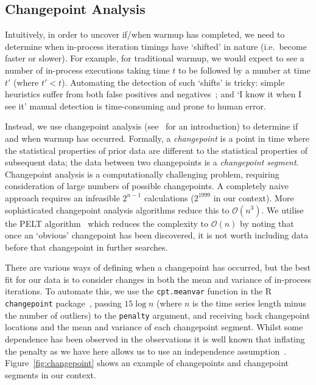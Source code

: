 \documentclass[acmsmall]{acmart}\settopmatter{printfolios=true}
\begin{document}
\subsection{Changepoint Analysis}

Intuitively, in order to uncover if/when warmup has completed, we need to
determine when in-process iteration timings have `shifted' in nature (i.e.~become
faster or slower). For example, for traditional warmup, we would expect to see a
number of in-process executions taking time $t$ to be followed by a number at
time $t'$ (where $t' < t$). Automating the detection of such `shifts' is
tricky: simple heuristics suffer from both false positives and negatives~\cite{kalibera13rigorous}; and
`I know it when I see it' manual detection is time-consuming and prone to human
error.

Instead, we use changepoint analysis (see~\citet{eckley11analysis} for an
introduction) to determine if and when warmup has occurred. Formally, a
\emph{changepoint} is a point in time where the statistical properties of prior
data are different to the statistical properties of subsequent data; the data
between two changepoints is a \emph{changepoint segment}.
Changepoint analysis is a computationally challenging problem, requiring
consideration of large numbers of possible changepoints. A completely naive
approach requires an infeasible $2^{n-1}$ calculations ($2^{1999}$ in our context).
More sophisticated changepoint analysis algorithms reduce this to $\mathcal{O}(n^3)$.
We utilise the PELT algorithm~\cite{killick12optimal} which reduces the
complexity to $\mathcal{O}(n)$ by noting that once an
`obvious' changepoint has been discovered, it is not worth including
data before that changepoint in further searches.

There are various ways of defining when a changepoint has occurred, but the best fit
for our data is to consider changes in both the mean and variance of in-process
iterations. To automate this, we use the \texttt{cpt.meanvar} function in the R
\texttt{changepoint} package~\cite{killick14changepoint}, passing $15\log{n}$ (where
$n$ is the time series length minus the number of outliers) to the
\texttt{penalty} argument, and receiving back changepoint locations and the mean and variance
of each changepoint segment. Whilst some dependence has been observed in the observations it is 
well known that inflating the penalty as we have here allows us to use an independence 
assumption~\cite{antoch97effect}. Figure~\ref{fig:changepoint} shows an example of changepoints and
changepoint segments in our context.
\end{document}
